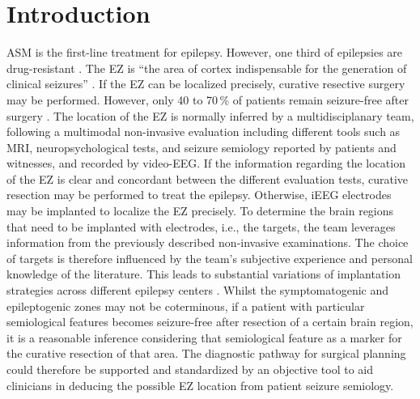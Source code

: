 \section{Introduction}

\Ac{ASM} is the first-line treatment for epilepsy.
However, one third of epilepsies are drug-resistant \cite{engel_what_2016}.
The \ac{EZ} is ``the area of cortex indispensable for the generation of clinical seizures'' \cite{rosenow_presurgical_2001}.
If the \ac{EZ} can be localized precisely, curative resective surgery may be performed.
However, only 40 to 70\,\% of patients remain seizure-free after surgery \cite{jobst_resective_2015}.
The location of the \ac{EZ} is normally inferred by a multidisciplanary team, following a multimodal non-invasive evaluation including different tools such as \ac{MRI}, neuropsychological tests, and seizure semiology reported by patients and witnesses, and recorded by video-\ac{EEG}.
If the information regarding the location of the \ac{EZ} is clear and concordant between the different evaluation tests, curative resection may be performed to treat the epilepsy.
Otherwise, \ac{iEEG} electrodes may be implanted to localize the \ac{EZ} precisely.
To determine the brain regions that need to be implanted with electrodes, i.e., the targets, the team leverages information from the previously described non-invasive examinations.
The choice of targets is therefore influenced by the team's subjective experience and personal knowledge of the literature.
This leads to substantial variations of implantation strategies across different epilepsy centers \cite{tufenkjian_seizure_2012}.
Whilst the symptomatogenic and epileptogenic zones may not be coterminous, if a patient with particular semiological features becomes seizure-free after resection of a certain brain region, it is a reasonable inference considering that semiological feature as a marker for the curative resection of that area.
The diagnostic pathway for surgical planning could therefore be supported and standardized by an objective tool to aid clinicians in deducing the possible \ac{EZ} location from patient seizure semiology.

